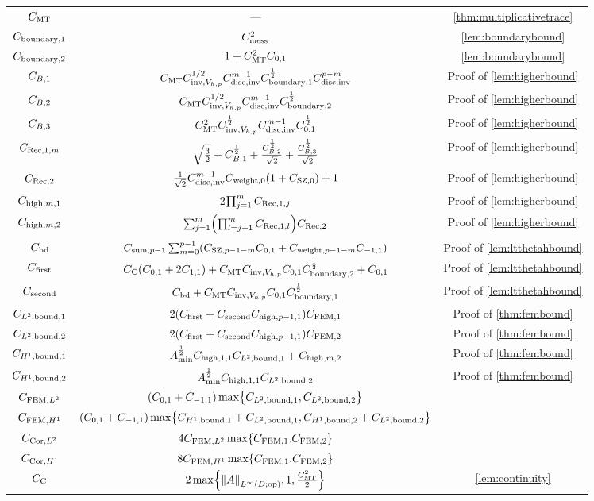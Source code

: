 \begin{longtabu}{ccc}
  $C_{\mathrm{MT}}$ &---&\cref{thm:multiplicativetrace}\\
  $C_{\mathrm{boundary},1}$ & $C_{\mathrm{mess}}^2$ & \cref{lem:boundarybound} \\
  $C_{\mathrm{boundary},2}$ & $1 + C_{\mathrm{MT}}^2 C_{0,1}$ & \cref{lem:boundarybound}\\
  $C_{B,1}$&$C_{\mathrm{MT}} C_{\mathrm{inv},V_{h,p}}^{1/2} C_{\mathrm{disc},\mathrm{inv}}^{m-1} C_{\mathrm{boundary},1}^{\frac{1}{2}} C_{\mathrm{disc},\mathrm{inv}}^{p-m}$&Proof of \cref{lem:higherbound}\\
  $C_{B,2}$&$C_{\mathrm{MT}} C_{\mathrm{inv},V_{h,p}}^{1/2} C_{\mathrm{disc},\mathrm{inv}}^{m-1} C_{\mathrm{boundary},2}^{\frac{1}{2}}$&Proof of \cref{lem:higherbound}\\
  $C_{B,3}$&$C_{\mathrm{MT}}^2 C_{\mathrm{inv},V_{h,p}}^{\frac{1}{2}} C_{\mathrm{disc},\mathrm{inv}}^{m-1}C_{0,1}^{\frac{1}{2}}$&Proof of \cref{lem:higherbound}\\
  $C_{\mathrm{Rec},1,m}$&$\sqrt{\frac32} + C_{B,1}^{\frac{1}{2}} + \frac{C_{B,2}^{\frac{1}{2}}}{\sqrt{2}}+ \frac{C_{B,3}^{\frac{1}{2}}}{\sqrt{2}}$&Proof of \cref{lem:higherbound}\\
  $C_{\mathrm{Rec},2}$&$\frac1{\sqrt{2}}\Chinv^{m-1}\Cwfn{0}\mleft(1+\CSZfn{0}\mright)+1$&Proof of \cref{lem:higherbound}\\
  $C_{\mathrm{high},m,1}$ & 2$\prod_{j=1}^mC_{\mathrm{Rec},1,j}$&Proof of \cref{lem:higherbound}\\
  $C_{\mathrm{high},m,2}$ &$\sum_{j=1}^{m} \mleft(\prod_{l=j+1}^m \CRecofn{l}\mright) \CRect$&Proof of \cref{lem:higherbound}\\
  $C_{\mathrm{bd}}$ &$\Csumfn{p-1}\sum_{m=0}^{p-1} \mleft(\CSZfn{p-1-m}\Cfn{0,1} + \Cwfn{p-1-m} \Cfn{-1,1}\mright)$&Proof of \cref{lem:ltthetahbound}\\
  $C_{\mathrm{first}}$ &$\Cc\mleft(\Cfn{0,1} + 2\Cfn{1,1}\mright) + \CMT \CinvVhp \Cfn{0,1} \Cboundaryt^{\half} + \Cfn{0,1}$&Proof of \cref{lem:ltthetahbound}\\
    $C_{\mathrm{second}}$ &$C_{\mathrm{bd}}  + C_{\mathrm{MT}} C_{\mathrm{inv},V_{h,p}} C_{0,1}C_{\mathrm{boundary},1}^{\frac{1}{2}}$&Proof of \cref{lem:ltthetahbound}\\
  $C_{L^{2},\mathrm{bound},1}$&$ 2\mleft(\Cfirst + \Csecond\Chighfn{p-1,1}\mright)\CFEMo$&Proof of \cref{thm:fembound}\\
  $C_{L^{2},\mathrm{bound},2}$&$2\mleft(\Cfirst + \Csecond\Chighfn{p-1,1}\mright)\CFEMt$&Proof of \cref{thm:fembound}\\
  $C_{H^{1},\mathrm{bound},1}$&$A_{\min}^{\frac{1}{2}}C_{\mathrm{high},1,1}C_{L^{2},\mathrm{bound},1}+C_{\mathrm{high},m,2}$&Proof of \cref{thm:fembound}\\
  $C_{H^{1},\mathrm{bound},2}$&$A_{\min}^{\frac{1}{2}}C_{\mathrm{high},1,1}C_{L^{2},\mathrm{bound},2}$&Proof of \cref{thm:fembound}\\
  $C_{\mathrm{FEM},L^{2}}$&$\mleft(\Cfn{0,1} + \Cfn{-1,1}\mright) \max\set{\CLtboundo,\CLtboundt}$&\\
  $C_{\mathrm{FEM},H^{1}}$&$\mleft(\Cfn{0,1} + \Cfn{-1,1}\mright)\max\set{\CHoboundo+\CLtboundo,\CHoboundt+\CLtboundt}$&\\
  $C_{\mathrm{Cor},L^{2}}$&$4\CFEMLt\max\set{\CFEMo.\CFEMt}$&\\
  $C_{\mathrm{Cor},H^{1}}$&$8\CFEMHo\max\set{\CFEMo.\CFEMt}$&\\
  $C_{\mathrm{C}}$&$2\max\set{\NLiDop{A},1,\frac{\CMT^2}2}$&\cref{lem:continuity}\\
\bottomrule
\end{longtabu}
